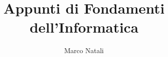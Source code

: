 \documentclass[a4paper,11pt,fleqn]{report}
\begin{document}
\author{Marco Natali}
\title{Appunti di Fondamenti dell'Informatica}
\maketitle
\end{document}
